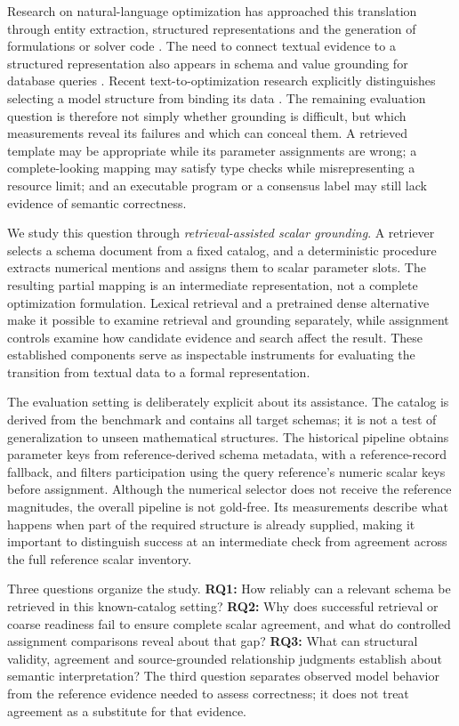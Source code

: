\documentclass[pdflatex,sn-basic,Numbered]{sn-jnl}
\begin{document}
Research on natural-language optimization has approached this translation through entity extraction, structured representations and the generation of formulations or solver code \cite{ramamonjison2022autoformulation,ramamonjison2023nl4opt,kadioglu2024ner4opt,ahmaditeshnizi2024optimus_icml}. The need to connect textual evidence to a structured representation also appears in schema and value grounding for database queries \cite{deng2021strug}. Recent text-to-optimization research explicitly distinguishes selecting a model structure from binding its data \cite{gao2026models}. The remaining evaluation question is therefore not simply whether grounding is difficult, but which measurements reveal its failures and which can conceal them. A retrieved template may be appropriate while its parameter assignments are wrong; a complete-looking mapping may satisfy type checks while misrepresenting a resource limit; and an executable program or a consensus label may still lack evidence of semantic correctness.

We study this question through \emph{retrieval-assisted scalar grounding}. A retriever selects a schema document from a fixed catalog, and a deterministic procedure extracts numerical mentions and assigns them to scalar parameter slots. The resulting partial mapping is an intermediate representation, not a complete optimization formulation. Lexical retrieval and a pretrained dense alternative make it possible to examine retrieval and grounding separately, while assignment controls examine how candidate evidence and search affect the result. These established components serve as inspectable instruments for evaluating the transition from textual data to a formal representation.

The evaluation setting is deliberately explicit about its assistance. The catalog is derived from the benchmark and contains all target schemas; it is not a test of generalization to unseen mathematical structures. The historical pipeline obtains parameter keys from reference-derived schema metadata, with a reference-record fallback, and filters participation using the query reference's numeric scalar keys before assignment. Although the numerical selector does not receive the reference magnitudes, the overall pipeline is not gold-free. Its measurements describe what happens when part of the required structure is already supplied, making it important to distinguish success at an intermediate check from agreement across the full reference scalar inventory.

Three questions organize the study. \textbf{RQ1:} How reliably can a relevant schema be retrieved in this known-catalog setting? \textbf{RQ2:} Why does successful retrieval or coarse readiness fail to ensure complete scalar agreement, and what do controlled assignment comparisons reveal about that gap? \textbf{RQ3:} What can structural validity, agreement and source-grounded relationship judgments establish about semantic interpretation? The third question separates observed model behavior from the reference evidence needed to assess correctness; it does not treat agreement as a substitute for that evidence.
\end{document}
